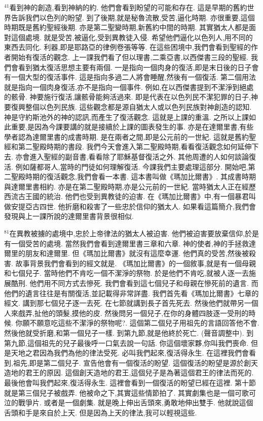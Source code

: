 \documentclass{book}
\begin{document}
$^{41}$看到神的創造,看到神納的約.
他們會看到盼望的可能和存在.
這是早期的舊約世界告訴我們以色列的盼望.
到了後期,就是秘魯流散,受苦,逼化時期.
亦很重要,這個時期既是舊約聖經後期.
亦是第二聖變時期,新舊約中間的時期.
其實猶太人都是面對這個處境.
就是受苦,被逼化,受到異教徒入侵.
希望他們逼化以色列人,用不同的東西去同化.
利器,即是耶路亞的律例卷張等等.
在這些困境中,我們會看到聖經的作者開始有復活的觀念.
上一課我們看了但以理書,二乘亞書,以西傑書三段的聖經.
我們會看到猶太復活思想主要有兩個.
一是指向一個肉身的復活,即是末日後的日子會有一個大型的復活事件.
這是指向多過二人將會睡醒,然後有一個復活.
第二個用法就是指向一個肉身復活,亦不是指向一個事件.
例如,在以西傑書提到不潔淨到絕處的骸骨.
神要施行復活,讓骸骨能夠活過來.
即是代表在以色列民不潔犯罪的日子,神要復興整個以色列民族.
這些觀念都是源自猶太人或以色列民族對神創造的認知.
神是守約斯池外的神的認訊,而產生了復活觀念.
這就是上課的重溫.
之所以上課如此重要,是因為今課要講的就是接續於上課的圖表發生的事.
亦是在達爾里書,有些學者認為達爾里書的成書時期.
是在兩者之間,即是公元前的一世紀.
這就是舊約聖經和第二聖殿時期的書段.
我們今天會進入第二聖殿時期,看看復活觀念如何延伸下去.
亦會進入聖經的副音書,看看除了耶穌基督復活之外.
其他周遭的人如何談論復活.
例如薩都哥人,當時的門徒如何理解復活.
今課我們主要處理這部分.
開始吧,第二聖殿時期的復活觀念,我們會看一本書.
這本書叫做《瑪加比爾書》.
其成書時期與達爾里書相約.
亦是在第二聖殿時期,亦是公元前的一世紀.
當時猶太人正在經歷西流古王國的統治.
他們也受到異教徒的迫害.
在《瑪加比爾書》中,有一個暴君叫做安提亞古四世.
他折磨和殺害了一些忠於信仰的猶太人.
如果看這篇簡介,我們會發現與上一課所說的達爾里書背景很相似.

$^{81}$在異教被擄的處境中,忠於上帝律法的猶太人被迫害.
他們被迫害要放棄信仰,於是有一個受苦的處境.
當然我們會看到達爾里書三章和六章.
神的使者,神的手拯救達爾里的朋友和達爾里.
但《瑪加比爾書》就沒有這麼幸運.
他們真的受苦,然後被殺害.
故事背景我們會看到的經文就是.
《瑪加比爾書》的一個敘事,就是有一個母親和七個兒子.
當時他們不肯吃一個不潔淨的祭物.
於是他們不肯吃,就被人逐一去施展酷刑.
他們用不同方式去慘死.
我們會看到這七個兒子和母親在慘死前的遺言.
而他們的遺言往往是有關復活,並記載得非常詳盡.
我們首先看《瑪加比爾書》七章的經文.
講到那七個兒子逐一去死.
在七節就講到長子首先死去.
然後他們就帶另一個人來戲弄,扯他的頭髮,摸他的皮.
然後問另一個兒子,在你的身體四肢逐一受刑的時候.
你願不願意吃這些不潔淨的祭物呢?.
這個第二個兒子用祖先的言語回答他不會.
然後他就受折磨,和第一個兒子一樣.
到第九節,就是他終於死亡.
(聲音調整中).
到第九節,這個祖先的兒子最後呼一口氣去說一句話.
你這個壞家夥,你叫我們喪命.
但是天地之君因為我們為他的律法受死.
必叫我們起來,復活得永生.
在這裡我們會看到,祖先,即是第二個兒子.
宣告他會有一個復活的盼望.
這個復活的盼望是源於創天造地的君王的原因.
這個創天造地的君王,這個兒子是為著這個君王的律法而死的.
最後他會叫我們起來,復活得永生.
這裡會看到一個復活的盼望已經在這裡.
第十節就是第三個兒子被戲弄.
他被命之下,其實這些情節拍了.
其實劇集也是一個可歌可泣的戰爭片.
或者是一個劇集.
就是晚上伸出舌頭來,勇敢地伸出雙手.
他就說這個舌頭和手是來自於上天.
但是因為上天的律法,我可以輕視這些.
\end{document}
